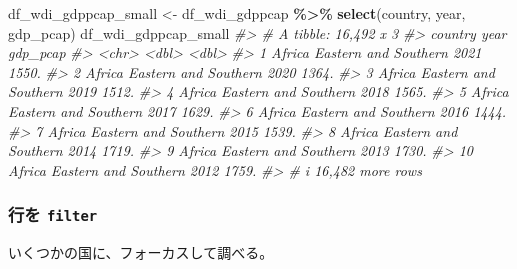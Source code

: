 \documentclass[
  xelatex, ja=standard]{bxjsbook}
\newenvironment{Shaded}{\begin{snugshade}}{\end{snugshade}}
\newcommand{\CommentTok}[1]{\textcolor[rgb]{0.56,0.35,0.01}{\textit{#1}}}
\newcommand{\FunctionTok}[1]{\textcolor[rgb]{0.13,0.29,0.53}{\textbf{#1}}}
\newcommand{\NormalTok}[1]{#1}
\newcommand{\OtherTok}[1]{\textcolor[rgb]{0.56,0.35,0.01}{#1}}
\newcommand{\SpecialCharTok}[1]{\textcolor[rgb]{0.81,0.36,0.00}{\textbf{#1}}}
\theoremstyle{definition}
\theoremstyle{definition}
\theoremstyle{definition}
\theoremstyle{definition}
\theoremstyle{remark}
\begin{document}
\begin{Shaded}
\begin{Highlighting}[]
\NormalTok{df\_wdi\_gdppcap\_small }\OtherTok{\textless{}{-}}\NormalTok{ df\_wdi\_gdppcap }\SpecialCharTok{\%\textgreater{}\%} 
  \FunctionTok{select}\NormalTok{(country, year, gdp\_pcap)}
\NormalTok{df\_wdi\_gdppcap\_small}
\CommentTok{\#\textgreater{} \# A tibble: 16,492 x 3}
\CommentTok{\#\textgreater{}    country                      year gdp\_pcap}
\CommentTok{\#\textgreater{}    \textless{}chr\textgreater{}                       \textless{}dbl\textgreater{}    \textless{}dbl\textgreater{}}
\CommentTok{\#\textgreater{}  1 Africa Eastern and Southern  2021    1550.}
\CommentTok{\#\textgreater{}  2 Africa Eastern and Southern  2020    1364.}
\CommentTok{\#\textgreater{}  3 Africa Eastern and Southern  2019    1512.}
\CommentTok{\#\textgreater{}  4 Africa Eastern and Southern  2018    1565.}
\CommentTok{\#\textgreater{}  5 Africa Eastern and Southern  2017    1629.}
\CommentTok{\#\textgreater{}  6 Africa Eastern and Southern  2016    1444.}
\CommentTok{\#\textgreater{}  7 Africa Eastern and Southern  2015    1539.}
\CommentTok{\#\textgreater{}  8 Africa Eastern and Southern  2014    1719.}
\CommentTok{\#\textgreater{}  9 Africa Eastern and Southern  2013    1730.}
\CommentTok{\#\textgreater{} 10 Africa Eastern and Southern  2012    1759.}
\CommentTok{\#\textgreater{} \# i 16,482 more rows}
\end{Highlighting}
\end{Shaded}

\hypertarget{ux884cux3092-filter}{%
\subsubsection{\texorpdfstring{行を \texttt{filter}}{行を filter}}\label{ux884cux3092-filter}}

いくつかの国に、フォーカスして調べる。
\end{document}
